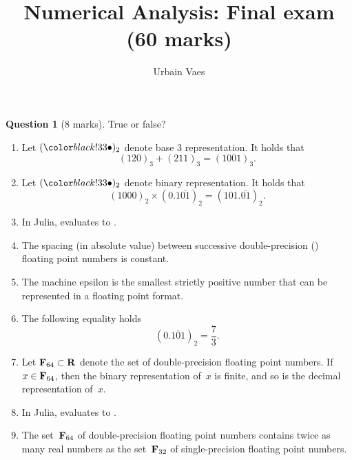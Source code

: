 \documentclass[11pt]{article}
\theoremstyle{definition}
\newtheorem{question}{Question}
\begin{document}
\title{Numerical Analysis: Final exam (60 marks)}
\author{Urbain Vaes}
\maketitle

\begin{question}
    [8 marks]
    True or false?
    \begin{enumerate}
        \item
            Let $(\placeholder)_2$ denote base 3 representation.
            It holds that
            \[
                (120)_3 + (211)_3 = (1001)_3.
            \]
        \item
            Let $(\placeholder)_2$ denote binary representation.
            It holds that
            \[
                (1000)_2 \times (0.1\overline{01})_2 = (101.\overline{01})_2.
            \]

        \item In Julia,  evaluates to .

        \item The spacing (in absolute value) between successive double-precision () floating point numbers is constant.

        \item
            The machine epsilon is the smallest strictly positive number that can be represented in a floating point format.

        \item
            The following equality holds
            \[
                (0.\overline{101})_2 = \frac{7}{3}.
            \]

        \item
            Let $\mathbf F_{64} \subset \mathbf R$ denote the set of double-precision floating point numbers.
            If $x \in \mathbf F_{64}$, then the binary representation of~$x$ is finite,
            and so is the decimal representation of~$x$.

        \item
            In Julia,  evaluates to .

        \item
            The set~$\mathbf F_{64}$ of double-precision floating point numbers contains twice as many real numbers
            as the set~$\mathbf F_{32}$ of single-precision floating point numbers.


\end{enumerate}
\end{question}
\end{document}
